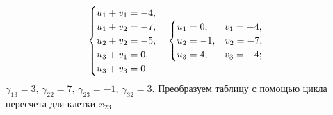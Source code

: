 $$
\begin{cases}
   u_1 + v_1 = -4,\\
   u_1 + v_2 = -7,\\
   u_2 + v_2 = -5,\\
   u_3 + v_1 = 0,\\
   u_3 + v_3 = 0.
\end{cases}
	\begin{cases}
		u_1 = 0,\hspace{3.7ex} v_1 = -4,\\
		u_2 = -1,\hspace{2ex} v_2 = -7,\\
		u_3 = 4,\hspace{3.7ex} v_3 = -4;
	\end{cases}
$$
$\gamma_{13}=3$, $\gamma_{22}=7$, $\gamma_{23}=-1$, $\gamma_{32}=3$. Преобразуем таблицу с помощью цикла пересчета для клетки $x_{23}$.
